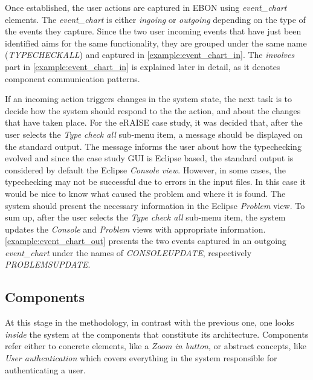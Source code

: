 \documentclass[conference]{IEEEtran}
\begin{document}
Once established, the user actions are captured in EBON using
\emph{event\_chart} elements. The \emph{event\_chart} is either
\emph{ingoing} or \emph{outgoing} depending on the type of the events
they capture.  Since the two user incoming events that have just been
identified aims for the same functionality, they are grouped under the
same name (\emph{TYPECHECKALL}) and captured in
\autoref{example:event_chart_in}.  The \emph{involves} part in
\autoref{example:event_chart_in} is explained later in detail, as it
denotes component communication patterns.



If an incoming action triggers changes in the system state, the next
task is to decide how the system should respond to the the action, and
about the changes that have taken place.  For the eRAISE case study,
it was decided that, after the user selects the \emph{Type check all}
sub-menu item, a message should be displayed on the standard output.
The message informs the user about how the typechecking evolved and
since the case study GUI is Eclipse based, the standard output is
considered by default the Eclipse \emph{Console view}.  However, in
some cases, the typechecking may not be successful due to errors in
the input files.  In this case it would be nice to know what caused
the problem and where it is found.  The system should present the
necessary information in the Eclipse \emph{Problem} view.  To sum up,
after the user selects the \emph{Type check all} sub-menu item, the
system updates the \emph{Console} and \emph{Problem} views with
appropriate information. \autoref{example:event_chart_out} presents
the two events captured in an outgoing \emph{event\_chart} under the
names of \emph{CONSOLEUPDATE}, respectively \emph{PROBLEMSUPDATE}.

%
\subsection{Components}
\label{sec:components}

At this stage in the methodology, in contrast with the previous one,
one looks \emph{inside} the system at the components that constitute
its architecture.  Components refer either to concrete elements, like a
\emph{Zoom in button}, or abstract concepts, like \emph{User
  authentication} which covers everything in the system responsible
for authenticating a user.
\end{document}
